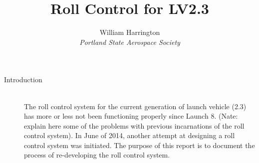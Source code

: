 \documentclass[12pt]{article}
\begin{document}
\title{Roll Control for LV2.3}
\author{William Harrington\\ %
\textit{Portland State Aerospace Society}} %
 
\maketitle

\begin{description}
	\item[Introduction] \hfill \\
		The roll control system for the current generation of launch vehicle (2.3) has more or less not been functioning properly since Launch 8. (Nate: explain here some of the problems with previous incarnations of the roll control system). In June of 2014, another attempt at designing a roll control system was initiated. The purpose of this report is to document the process of re-developing the roll control system.
		
\end{description}
 
\end{document}
